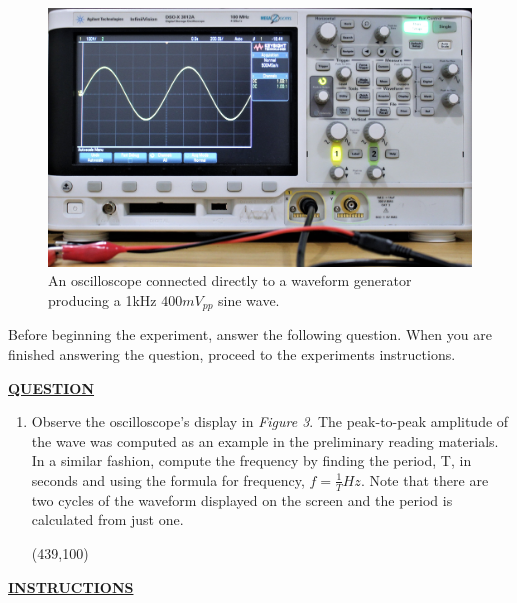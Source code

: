 \documentclass[12pt]{article}
\begin{document}
\begin{figure}[H]
    \centering
    \includegraphics[width=12cm]{photos/prelim/oscilloscope.jpg}
    \caption{An oscilloscope connected directly to a waveform generator producing a 1kHz $400mV_{pp}$ sine wave.}
\end{figure}

Before beginning the experiment, answer the following question. When you are finished answering the question, proceed to the experiments instructions.

\textbf{\underline{QUESTION}}
\begin{enumerate}
    \item Observe the oscilloscope's display in \textit{Figure 3}. The peak-to-peak amplitude of the wave was computed as an example in the preliminary reading materials. In a similar fashion, compute the frequency by finding the period, T, in seconds and using the formula for frequency, $f = \frac{1}{T} Hz$. Note that there are two cycles of the waveform displayed on the screen and the period is calculated from just one.
    
    \framebox(439,100){}
\end{enumerate}
\newpage
\textbf{\underline{INSTRUCTIONS}}
\end{document}
